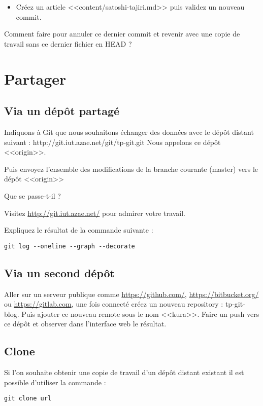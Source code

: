 \documentclass[a4paper]{article}
\begin{document}
\begin{itemize}
  \item Créez un article <<content/satoshi-tajiri.md>> puis validez un nouveau commit.
\end{itemize}

Comment faire pour annuler ce dernier commit et revenir avec une copie de travail sans ce dernier fichier en HEAD ?

\section{Partager}

\subsection{Via un dépôt partagé}

Indiquons à Git que nous souhaitons échanger des données avec le dépôt distant suivant : http://git.iut.azae.net/git/tp-git.git
Nous appelons ce dépôt <<origin>>.

Puis envoyez l'ensemble des modifications de la branche courante (master) vers le dépôt <<origin>>

Que se passe-t-il ?

Visitez \url{http://git.iut.azae.net/} pour admirer votre travail.

Expliquez le résultat de la commande suivante : 
\begin{verbatim}
git log --oneline --graph --decorate
\end{verbatim}

\subsection{Via un second dépôt}

Aller sur un serveur publique comme \url{https://github.com/}, \url{https://bitbucket.org/} ou \url{https://gitlab.com}, une fois connecté créez un nouveau repository : tp-git-blog. Puis ajouter ce nouveau remote sous le nom <<kura>>. Faire un push vers ce dépôt et observer dans l'interface web le résultat.

\subsection{Clone}
Si l'on souhaite obtenir une copie de travail d'un dépôt distant existant il est possible d'utiliser la commande :
\begin{verbatim}
git clone url
\end{verbatim}
\end{document}
